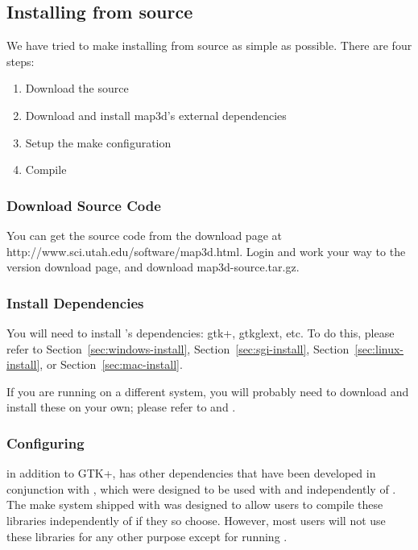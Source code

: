 \subsection{Installing from source}
\label{sec:source-install}

We have tried to make installing \map{} from source as simple as possible.  
There are four steps:


\begin{enumerate}
  \item Download the source
  \item Download and install map3d's external dependencies
  \item Setup the make configuration
  \item Compile
\end{enumerate}

\subsubsection{Download Source Code}
You can get the \map{} source code from the \map{} download page at 
{http://www.sci.utah.edu/software/map3d.html}.  Login and work your way
to the \map{} version \version{} download page, and download 
map3d-source.tar.gz.

\subsubsection{Install Dependencies}
You will need to install \map{}'s dependencies: gtk+, gtkglext, etc. 
To do this, please refer to Section~\ref{sec:windows-install},
Section~\ref{sec:sgi-install}, Section~\ref{sec:linux-install},
or Section~\ref{sec:mac-install}.  

If you are running on a different
system, you will probably need to download and install these on 
your own; please refer to 
and .

\subsubsection{Configuring \map{}}
\map{} in addition to GTK+, \map{} has other dependencies that have been
developed in conjunction with \map{}, which were designed to be used 
with and independently of \map{}.  The make system shipped with \map{}
was designed to allow users to compile these libraries independently
of \map{} if they so choose.  However, most users will not use
these libraries for any other purpose except for running \map{}.

